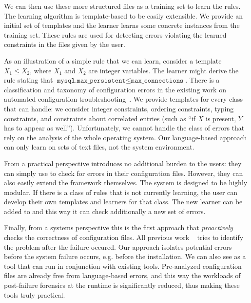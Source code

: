 We can then use these more structured files
as a training set to learn the rules. The learning algorithm
is template-based to be easily extensible. We provide an initial set of templates and the
learner learns some concrete instances from the training set. These
rules are used for detecting errors violating the learned constraints
in the files given by the user.

As an 
illustration of a simple rule that we can learn, consider a template
 $X_1 \le X_2$, where $X_1$ and $X_2$ are
integer variables. The learner might derive the rule stating that
$\texttt{mysql.max\_persistent} \le \texttt{max\_connections}$. There is a classification and taxonomy of configuration errors in the 
existing work on automated configuration troubleshooting~\cite{yin11anempirical, configdataset}. We provide templates for every class that \app can handle: we consider integer constraints, ordering
constraints, typing constraints, and constraints about correlated entries (such as ``if $X$ is present, $Y$ has to appear as well''). 
Unfortunately, we cannot handle the class of errors that rely on the analysis of the whole operating system.
Our language-based approach can only learn on sets of text files, not the system environment.

From a practical perspective \app introduces no additional burden 
to the users: they can simply use \app to check for errors in their configuration files. However, they can also easily extend the framework themselves. The system is designed to be highly modular. If there is a class of rules that \app is not currently learning, the user can develop their own templates and learners for that class. The new learner can be added to \app and this way it can check additionally a new set of errors.

Finally, from a systems perspective this is the first approach that {\emph{proactively}} checks 
 the correctness of configuration files. All previous work
~\cite{xu15systems,zhang14encore,yuan11context, wang04automatic,attariyan10automating,
su07autobash,whitaker04configuration} tries to identify the problem after the
failure occured. Our approach isolates potential errors before the system failure occurs, e.g. before the installation. We can also see \app as a tool that can run in conjunction with existing tools. Pre-analyzed configuration files are already free from language-based errors, and this way the workloads of post-failure forensics at the runtime
is significantly reduced, thus making these tools truly practical.


